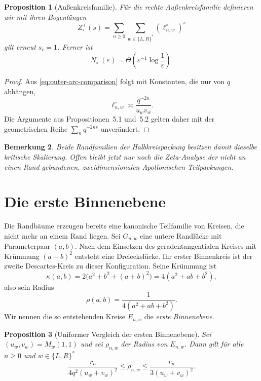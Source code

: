 \documentclass[11pt,a4paper]{article}
\newtheorem{remark}{Bemerkung}[section]
\newtheorem{proposition}[remark]{Proposition}
\begin{document}
\begin{proposition}[Außenkreisfamilie]
Für die rechte Außenkreisfamilie definieren wir mit ihren Bogenlängen
\[
 Z_\circ^+(s)=\sum_{n\ge0}\sum_{w\in\{L,R\}^*}
 (\ell^{\circ}_{n,w})^s
\]
gilt erneut $s_c=1$. Ferner ist
\[
 N_\circ^+(\varepsilon)=
 \Theta\!\left(\varepsilon^{-1}\log\frac1\varepsilon\right).
\]
\end{proposition}

\begin{proof}
Aus \eqref{eq:outer-arc-comparison} folgt mit Konstanten, die nur von $q$
abhängen,
\[
 \ell^{\circ}_{n,w}\asymp\frac{q^{-2n}}{u_wv_w}.
\]
Die Argumente aus Propositionen~5.1 und~5.2 gelten daher mit der
geometrischen Reihe $\sum_n q^{-2ns}$ unverändert.
\end{proof}

\begin{remark}
Beide Randfamilien der Halbkreispackung besitzen damit dieselbe kritische
Skalierung. Offen bleibt jetzt nur noch die Zeta-Analyse der nicht an einen
Rand gebundenen, zweidimensionalen Apollonischen Teilpackungen.
\end{remark}

\section{Die erste Binnenebene}

Die Randbäume erzeugen bereits eine kanonische Teilfamilie von Kreisen, die
nicht mehr an einem Rand liegen. Sei $G_{n,w}$ eine untere Randlücke mit
Parameterpaar $(a,b)$. Nach dem Einsetzen des geradentangentialen Kreises mit
Krümmung $(a+b)^2$ entsteht eine Dreieckslücke. Ihr erster Binnenkreis ist
der zweite Descartes-Kreis zu dieser Konfiguration. Seine Krümmung ist
\[
 \kappa(a,b)=2\bigl(a^2+b^2+(a+b)^2\bigr)
 =4(a^2+ab+b^2),
\]
also sein Radius
\begin{equation}\label{eq:seed-radius-exact}
 \rho(a,b)=\frac{1}{4(a^2+ab+b^2)}.
\end{equation}
Wir nennen die so entstehenden Kreise $E_{n,w}$ die \emph{erste
Binnenebene}.

\begin{proposition}[Uniformer Vergleich der ersten Binnenebene]
Sei $(u_w,v_w)=M_w(1,1)$ und sei $\rho_{n,w}$ der Radius von $E_{n,w}$.
Dann gilt für alle $n\ge0$ und $w\in\{L,R\}^*$
\begin{equation}\label{eq:seed-comparison}
 \frac{r_n}{4q^2(u_w+v_w)^2}
 \le \rho_{n,w}\le
 \frac{r_n}{3(u_w+v_w)^2}.
\end{equation}
\end{proposition}
\end{document}
